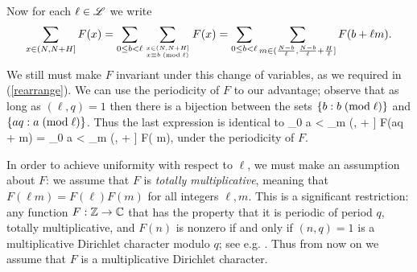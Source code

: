 \documentclass[oneside,11pt]{amsart}
\begin{document}
Now for each $\ell \in \mathscr{L}$ we write
\[ \sum_{x \in (N,N+H] } F(x) = \sum_{0 \leq b < \ell} \sum_{x \in (N,N+H] \atop x \equiv b \; ( \text{mod} \; \ell)} F(x)
	 = \sum_{0 \leq b < \ell} \sum_{m \in (\frac{N-b}{\ell}, \frac{N-b}{\ell} + \frac{H}{\ell}]} F(b + \ell m).\]
We still must make $F$ invariant under this change of variables, as we required in (\ref{rearrange}). We can use the periodicity of $F$ to our advantage;  observe that as long as $(\ell,q)=1$ then there is a bijection between the sets $\{b:  b \; ( \text{mod} \; \ell)\}$ and $\{ aq: a \; ( \text{mod} \; \ell)\}$. Thus the last expression is identical to 
\beq\label{mult}
 \sum_{0 \leq a < \ell} \sum_{m \in (,  + ]} F(aq + \ell m) = 
	\sum_{0 \leq a < \ell} \sum_{m \in (,  + ]} F( \ell m),
	\eeq
	under the periodicity of $F$. 
	
	In order to achieve uniformity with respect to $\ell$, we must make an assumption about $F$: we assume that $F$ is \emph{totally multiplicative}, meaning that $F(\ell m) = F(\ell) F(m)$ for all integers $\ell,m$. 
	 This is a significant restriction: any function $F : \mathbb{Z} \rightarrow \mathbb{C}$ that has the property that it is periodic of period $q$, totally multiplicative, and $F(n)$ is nonzero if and only if $(n,q)=1$ is a multiplicative Dirichlet character modulo $q$; see e.g. \cite[Thm. 6.15]{Apo76}. 
	 Thus from now on we assume that $F$ is a multiplicative Dirichlet character.	
	
	
	
\end{document}
